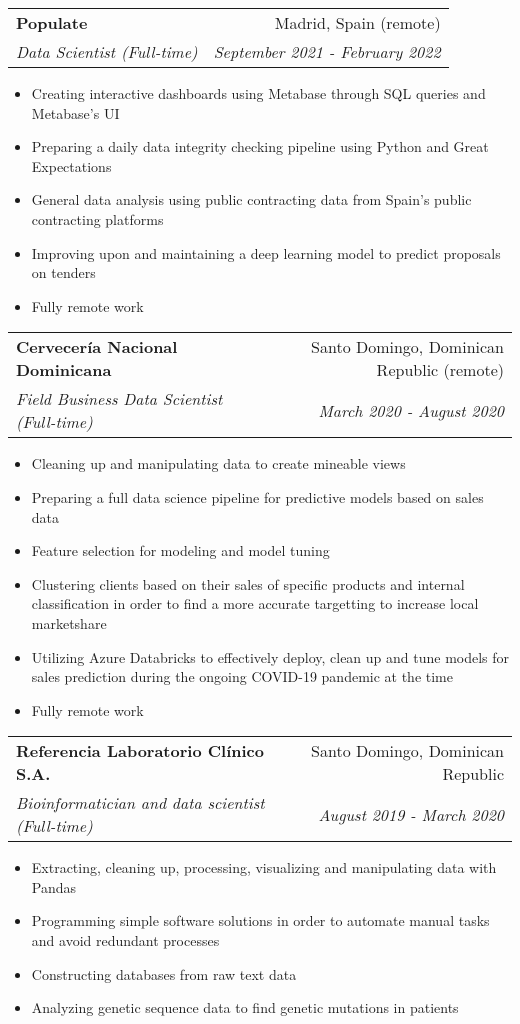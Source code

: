 \documentclass[a4paper,20pt]{article}
\makeatletter
\newcommand{\resumeSubheading}[4]{
  \vspace{-1pt}\item
    \begin{tabular*}{0.97\textwidth}{l@{\extracolsep{\fill}}r}
      \textbf{#1} & #2 \\
      \textit{#3} & \textit{#4} \\
    \end{tabular*}\vspace{-5pt}
}
\makeatother
\begin{document}
  \resumeSubheading{Populate}{Madrid, Spain (remote)}
    {Data Scientist (Full-time)}{September 2021 - February 2022}
\begin{itemize} \itemsep-0.24em
  \item Creating interactive dashboards using Metabase through SQL queries and Metabase's UI
  \item Preparing a daily data integrity checking pipeline using Python and Great Expectations
  \item General data analysis using public contracting data from Spain's public contracting platforms
  \item Improving upon and maintaining a deep learning model to predict proposals on tenders
  \item Fully remote work
\end{itemize}
\vspace{-4.2pt}
  \resumeSubheading{Cervecería Nacional Dominicana}{Santo Domingo, Dominican Republic (remote)}
    {Field Business Data Scientist (Full-time)}{March 2020 - August 2020}
\begin{itemize} \itemsep-0.24em
  \item Cleaning up and manipulating data to create mineable views
  \item Preparing a full data science pipeline for predictive models based on sales data
  \item Feature selection for modeling and model tuning
  \item Clustering clients based on their sales of specific products and internal classification in order to find a more accurate targetting to increase local marketshare
  \item Utilizing Azure Databricks to effectively deploy, clean up and tune models for sales prediction during the ongoing COVID-19 pandemic at the time
  \item Fully remote work
\end{itemize}
\vspace{-4.2pt}
  \resumeSubheading{Referencia Laboratorio Clínico S.A.}{Santo Domingo, Dominican Republic}
    {Bioinformatician and data scientist (Full-time)}{August 2019 - March 2020}
\begin{itemize} \itemsep-0.24em
  \item Extracting, cleaning up, processing, visualizing and manipulating data with Pandas
  \item Programming simple software solutions in order to automate manual tasks and avoid redundant processes
  \item Constructing databases from raw text data
  \item Analyzing genetic sequence data to find genetic mutations in patients
\end{itemize}
\end{document}
